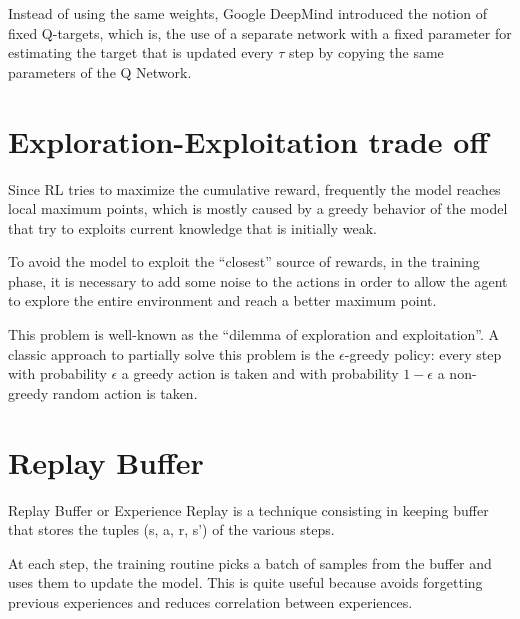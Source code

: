 \documentclass[Lau,oneside,noexaminfo]{sapthesis} %
\begin{document}
Instead of using the same weights, Google DeepMind introduced the notion of fixed Q-targets, which is, the use of a separate network with a fixed parameter for estimating the target that is updated every $\tau$ step by copying the same parameters of the Q Network.
\section{Exploration-Exploitation trade off}
Since RL tries to maximize the cumulative reward, frequently the model reaches local maximum points, which is mostly caused by a greedy behavior of the model that try to exploits current knowledge that is initially weak.

To avoid the model to exploit the “closest” source of rewards, in the training phase, it is necessary to add some noise to the actions in order to allow the agent to explore the entire environment and reach a better maximum point.

This problem is well-known as the “dilemma of exploration and exploitation”. \cite{SUTTONBARTO} A classic approach to partially solve this problem is the $\epsilon$-greedy policy: every step with probability $\epsilon$ a greedy action is taken and with probability $1 - \epsilon$ a non-greedy random action is taken.  
\section{Replay Buffer}
Replay Buffer or Experience Replay is a technique consisting in keeping buffer that stores the tuples (s, a, r, s’) of the various steps. 

At each step, the training routine picks a batch of samples from the buffer and uses them to update the model. This is quite useful because avoids forgetting previous experiences and reduces correlation between experiences.
\end{document}
